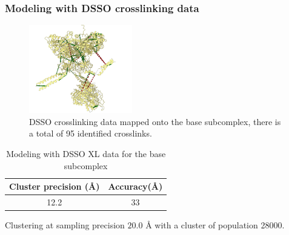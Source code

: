 \documentclass[a4paper,8pt]{beamer}
\begin{document}
\begin{frame}
  \frametitle{Modeling with DSSO crosslinking data}
  \begin{figure}
  \centering
  \includegraphics[width=0.4\textwidth]{figures/dsso-mapped-xls.png}
  \caption{DSSO crosslinking data mapped onto the base subcomplex, 
  there is a total of 95 identified crosslinks.}
  \end{figure}
  \begin{table}
    \centering
    \caption{Modeling with DSSO XL data for the base subcomplex}
    \begin{tabular}{|c|c|}
        \hline
        Cluster precision ({\AA}) & Accuracy({\AA}) \\ \hline
        12.2 & 33 \\ \hline
    \end{tabular}
    \end{table}
    Clustering at sampling precision $20.0$ {\AA} with
    a cluster of population 28000.
  \end{frame}
\end{document}
